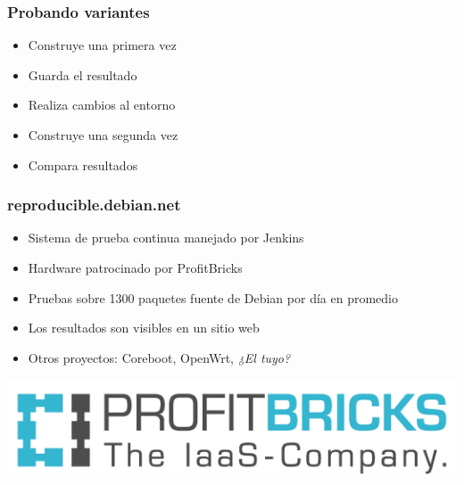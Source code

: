 \documentclass[14pt,aspectratio=169]{beamer}
\begin{document}
\begin{frame}
 \frametitle{Probando variantes}

 \begin{itemize}
  \item Construye una primera vez
  \item Guarda el resultado
  \item Realiza cambios al entorno
  \item Construye una segunda vez
  \item Compara resultados
 \end{itemize}
\end{frame}

\begin{frame}
 \frametitle{reproducible.debian.net}

 \begin{itemize}
  \item Sistema de prueba continua manejado por Jenkins
  \item Hardware patrocinado por ProfitBricks
  \item Pruebas sobre 1300 paquetes fuente de Debian por día en promedio
  \item Los resultados son visibles en un sitio web
  \item Otros proyectos: Coreboot, OpenWrt, \textit{¿El tuyo?}
 \end{itemize}
 \vfill
 \begin{center}
 \includegraphics[height=0.15\paperheight]{images/profitbricks_logo.png}
 \end{center}
\end{frame}
\end{document}
